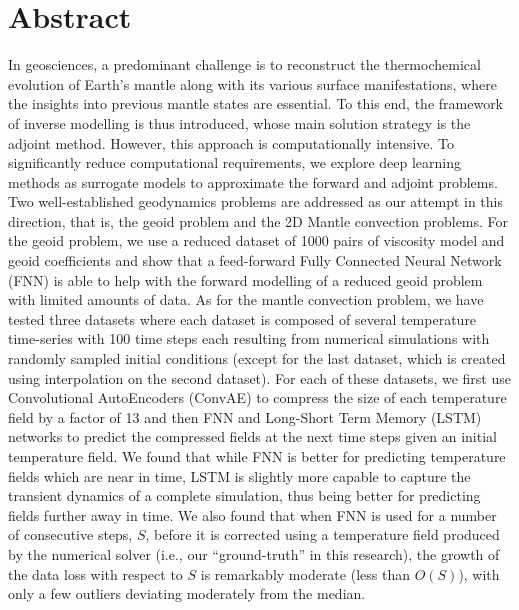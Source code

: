 \chapter*{Abstract}
In geosciences, a predominant challenge is to reconstruct the thermochemical evolution of Earth's mantle along with its various surface manifestations, where the insights into previous mantle states are essential. To this end, 
the framework of inverse modelling is thus introduced, whose main solution strategy is the adjoint method. However, this approach is computationally intensive. To significantly reduce computational requirements, we explore deep learning methods as surrogate models to approximate the forward and adjoint problems. Two well-established geodynamics problems are addressed as our attempt in this direction, that is, the geoid problem and the 2D Mantle convection problems. For the geoid problem, we use a reduced dataset of 1000 pairs of viscosity model and geoid coefficients and show that a feed-forward Fully Connected Neural Network (FNN) is able to help with the forward modelling of a reduced geoid problem with limited amounts of data. As for the mantle convection problem, we have tested three datasets where each dataset is composed of several temperature time-series with 100 time steps each resulting from numerical simulations with randomly sampled initial conditions (except for the last dataset, which is created using interpolation on the second dataset). For each of these datasets, we first use Convolutional AutoEncoders (ConvAE) to compress the size of each temperature field by a factor of 13 and then FNN and Long-Short Term Memory (LSTM) networks to predict the compressed fields at the next time steps given an initial temperature field. We found that while FNN is better for predicting temperature fields which are near in time, LSTM is slightly more capable to capture the transient dynamics of a complete simulation, thus being better for predicting fields further away in time. We also found that when FNN is used for a number of consecutive steps, $S$, before it is corrected using a temperature field produced by the numerical solver (i.e., our ``ground-truth'' in this research), the growth of the data loss with respect to $S$ is remarkably moderate (less than $O(S)$), with only a few outliers deviating moderately from the median.